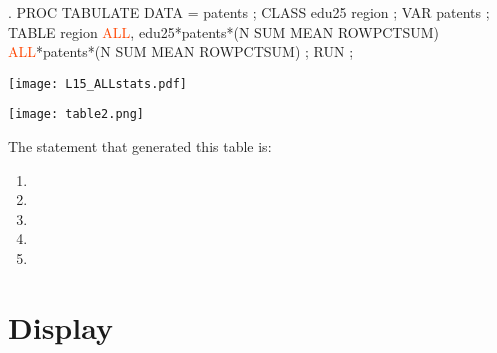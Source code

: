 \begin{frame}[fragile]
\begin{code}{.}
PROC TABULATE DATA = patents ;
  CLASS edu25 region ;
  VAR patents ;
  TABLE region \textcolor{OrangeRed}{ALL},
        edu25*patents*(N SUM MEAN ROWPCTSUM)
        \textcolor{OrangeRed}{ALL}*patents*(N SUM MEAN ROWPCTSUM) ;
RUN ;
\end{code}
\emp
\vspace{10pt}
\texttt{[image: L15\_ALLstats.pdf]}



\end{frame}


\begin{frame}
\texttt{[image: table2.png]}
\emp
\\
\begin{clicker}{The statement that generated this table is:}
\begin{enumerate}
\item {}
\item {}
\item {}
\item {}
\item {}
\end{enumerate}
\end{clicker}
\end{frame}


\section[Display]{Display}
\subsection{}
\begin{frame}
\end{frame}

